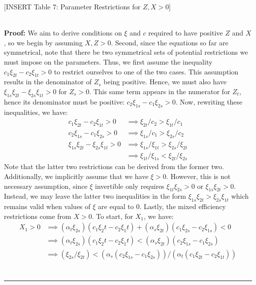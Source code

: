 \documentclass[11pt,a4paper,leqno]{extarticle}
\newenvironment{proof}[1][Proof]{\noindent\textbf{#1:} }{\ \rule{0.5em}{0.5em}}
\begin{document}
	\vspace{0.15in}
	\begin{center}
		[INSERT Table 7: Parameter Restrictions for $Z, X > 0$]
	\end{center}
	\vspace{0.15in}
	
	\hfill\\
	\begin{proof}
		We aim to derive conditions on $\xi$ and $c$ required to have positive $Z$ and $X$, so we begin by assuming $X, Z  > 0$. Second, since the equations so far are symmetrical, note that there be two symmetrical sets of potential restrictions we must impose on the parameters. Thus, we first assume the inequality $c_1 \xi_{2t} - c_2 \xi_{1t} > 0$ to restrict ourselves to one of the two cases. This assumption results in the denominator of $Z_s$ being positive. Hence, we must also have $\xi_{1s}\xi_{2t} - \xi_{2s}\xi_{1t} > 0 $ for $Z_s > 0$. This same term appears in the numerator for $Z_t$, hence its denominator must be positive: $c_2 \xi_{1s} - c_1 \xi_{2s} > 0$. Now, rewriting these inequalities, we have:
		\begin{align*}
		c_1 \xi_{2t} - c_2 \xi_{1t} > 0 &\implies \xi_{2t}/c_2 > \xi_{1t}/c_1 \\
		c_2 \xi_{1s} - c_1 \xi_{2s} > 0 &\implies \xi_{1s}/c_1 > \xi_{2s}/c_2 \\
		\xi_{1s}\xi_{2t} - \xi_{2s}\xi_{1t} > 0 &\implies \xi_{1s}/\xi_{1t} > \xi_{2s}/\xi_{2t} \\
		&\implies \xi_{1t}/\xi_{1s} < \xi_{2t}/\xi_{2s} 
		\end{align*}
		Note that the latter two restrictions can be derived from the former two. Additionally, we implicitly assume that we have $\xi > 0$. However, this is not necessary assumption, since $\xi$ invertible only requires $\xi_{1t} \xi_{2s} > 0$ or $\xi_{1s} \xi_{2t} > 0$. Instead, we may leave the latter two inequalities in the form $ \xi_{1s}\xi_{2t} > \xi_{2s}\xi_{1t}$ which remains valid when values of $\xi$ are equal to $0$. Lastly, the mixed efficiency restrictions come from $X > 0$. To start, for $X_1$, we have:
		\begin{align*}
		X_1 > 0 &\implies (\alpha_t \xi_{2s})(c_1 \xi_2t - c_2\xi_1t) + (\alpha_s \xi_{2t})(c_1 \xi_{2s} - c_2 \xi_{1s}) < 0\\
		&\implies (\alpha_t \xi_{2s})(c_1 \xi_2t - c_2\xi_1t) < (\alpha_s \xi_{2t})(c_2 \xi_{1s} - c_1 \xi_{2s}) \\
		&\implies (\xi_{2s}/\xi_{2t}) < (\alpha_s (c_2 \xi_{1s} - c_1 \xi_{2s}))/(\alpha_t(c_1 \xi_{2t} - c_2\xi_{1t})) \\

\end{align*}
\end{proof}
\end{document}
